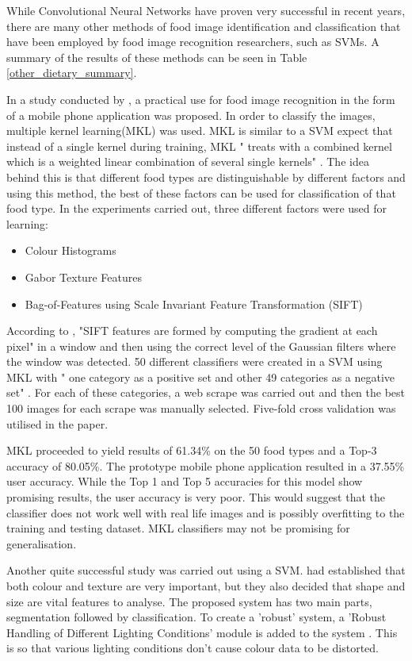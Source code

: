 While Convolutional Neural Networks have proven very successful in recent years, there are many other methods of food image identification and classification that have been employed by food image recognition researchers, such as SVMs.
A summary of the results of these methods can be seen in Table \ref{other_dietary_summary}.

In a study conducted by \parencite{kernelLearning}, a practical use for food image recognition in the form of a mobile phone application was proposed.
In order to classify the images, multiple kernel learning(MKL) was used.
MKL is similar to a SVM expect that instead of a single kernel during training, MKL " treats with a combined kernel which is a weighted linear combination of several single kernels" \parencite{kernelLearning}.
The idea behind this is that different food types are distinguishable by different factors and using this method, the best of these factors can be used for classification of that food type.
In the experiments carried out, three different factors were used for learning:
\begin{itemize}
	\item{Colour Histograms}
	\item{Gabor Texture Features}
	\item{Bag-of-Features using Scale Invariant Feature Transformation (SIFT)}
\end{itemize}

According to \parencite{sift}, "SIFT features are formed by computing the gradient at each pixel" in a window and then using the correct level of the Gaussian filters where the window was detected.
50 different classifiers were created in a SVM using MKL with " one category as a positive set and other 49 categories as a negative set" \parencite{kernelLearning}.
For each of these categories, a web scrape was carried out and then the best 100 images for each scrape was manually selected. Five-fold cross validation was utilised in the paper.

MKL proceeded to yield results of 61.34\% on the 50 food types and a Top-3 accuracy of 80.05\%.
The prototype mobile phone application resulted in a 37.55\% user accuracy.
While the Top 1 and Top 5 accuracies for this model show promising results, the user accuracy is very poor.
This would suggest that the classifier does not work well with real life images and is possibly overfitting to the training and testing dataset.
MKL classifiers may not be promising for generalisation.

Another quite successful study was carried out using a SVM.
\parencite{novelSVM} had established that both colour and texture are very important, but they also decided that shape and size are vital features to analyse.
The proposed system has two main parts, segmentation followed by classification.
To create a 'robust' system, a 'Robust Handling of Different Lighting Conditions' module is added to the system \parencite{novelSVM}.
This is so that various lighting conditions don't cause colour data to be distorted. 

